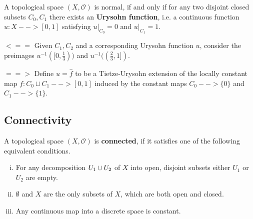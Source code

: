 \begin{corollary}
	A topological space $(X,\mathcal{O})$ is normal, if and only if for any two disjoint closed subsets $C_0,C_1$ there exists an \textbf{Urysohn function}, i.e. a continuous function $u:X --> [0,1]$ satisfying $u\vert_{C_0} = 0$ and $u\vert_{C_1} = 1$.
\end{corollary}
\begin{sketch}
	$<==$ Given $C_1,C_2$ and a corresponding Urysohn function $u$, consider the preimages $u^{-1}([0,\frac{1}{3}))$ and $u^{-1}((\frac{2}{3},1])$.

	$==>$ Define $u = \widehat{f}$ to be a Tietze-Urysohn extension of the locally constant map $f:C_0 \sqcup C_1 --> [0,1]$ induced by the constant maps $C_0 --> \{0\}$ and $C_1 --> \{1\}$.
\end{sketch}





\newpage
\subsection{Connectivity}

\begin{definition}
	A topological space $(X, \mathcal{O})$ is \textbf{connected}, if it satisfies one of the following equivalent conditions.
	\begin{enumerate}[(i)]
		\item{
			For any decomposition $U_1 \cup U_2$ of $X$ into open,  disjoint subsets either $U_1$ or $U_2$ are empty.
		}
		\item{
			$\emptyset$ and $X$ are the only subsets of $X$, which are both open and closed.
		}
		\item{
			Any continuous map into a discrete space is constant.
		}
	\end{enumerate}
\end{definition}

